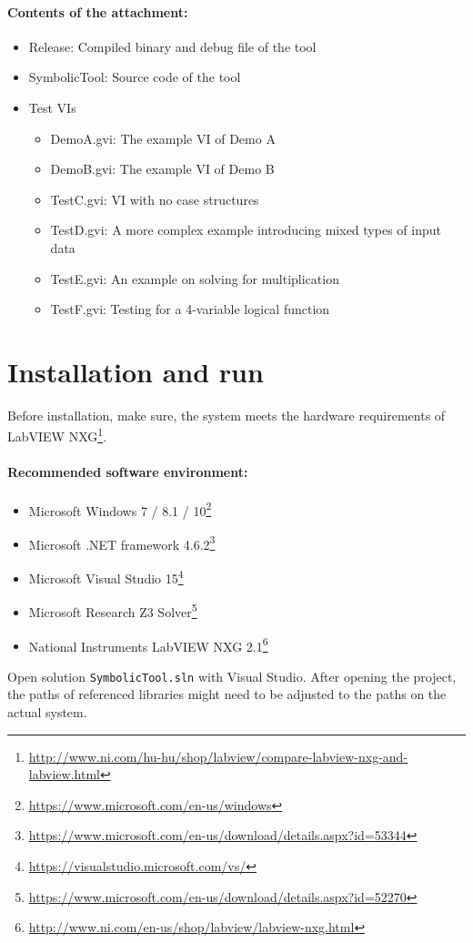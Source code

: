\paragraph{Contents of the attachment:}
\begin{itemize}
\item Release: Compiled binary and debug file of the tool
\item SymbolicTool: Source code of the tool
\item Test VIs

\begin{itemize}
\item Demo\textunderscore A.gvi: The example VI of Demo A
\item Demo\textunderscore B.gvi: The example VI of Demo B
\item Test\textunderscore C.gvi: VI with no case structures
\item Test\textunderscore D.gvi: A more complex example introducing mixed types of input data
\item Test\textunderscore E.gvi: An example on solving for multiplication
\item Test\textunderscore F.gvi: Testing for a 4-variable logical function

\end{itemize}
\end{itemize}
\section{Installation and run}

Before installation, make sure, the system meets the hardware requirements of LabVIEW NXG\footnote{\url{http://www.ni.com/hu-hu/shop/labview/compare-labview-nxg-and-labview.html}}.
\paragraph{Recommended software environment:}
\begin{itemize}
\item Microsoft Windows 7 / 8.1 / 10\footnote{\url{https://www.microsoft.com/en-us/windows}}
\item Microsoft .NET framework 4.6.2\footnote{\url{https://www.microsoft.com/en-us/download/details.aspx?id=53344}}
\item Microsoft Visual Studio 15\footnote{\url{https://visualstudio.microsoft.com/vs/}}
\item Microsoft Research Z3 Solver\footnote{\url{https://www.microsoft.com/en-us/download/details.aspx?id=52270}}
\item National Instruments LabVIEW NXG 2.1\footnote{\url{http://www.ni.com/en-us/shop/labview/labview-nxg.html}}
\end{itemize}
Open solution \verb|SymbolicTool.sln| with Visual Studio. After opening the project, the paths of referenced libraries might need to be adjusted to the paths on the actual system. 

